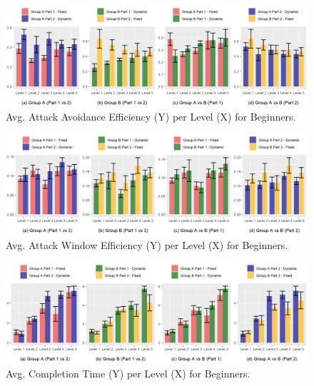 \begin{figure}[!ht]
    \begin{center}
    \caption{Avg. Attack Avoidance Efficiency (Y) per Level (X) for Beginners.}
        \includegraphics[width=34em]{figures/attack_avoidance_efficiency-beginner_players.png}
    \end{center}
    \label{fig:result-metric-beginners-attack-avoidance-efficiency}
\end{figure}

\begin{figure}[!ht]
    \begin{center}
    \caption{Avg. Attack Window Efficiency (Y) per Level (X) for Beginners.}
        \includegraphics[width=34em]{figures/attack_window_efficiency-beginner_players.png}
    \end{center}
    \label{fig:result-metric-beginners-attack-window-efficiency}
\end{figure}

\begin{figure}[!ht]
    \begin{center}
    \caption{Avg. Completion Time (Y) per Level (X) for Beginners.}
        \includegraphics[width=34em]{figures/completion_time-beginner_players.png}
    \end{center}
    \label{fig:result-metric-beginners-completion-time}
\end{figure}

